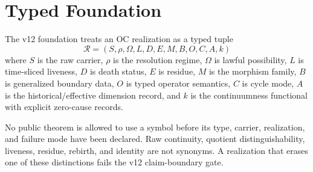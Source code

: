 \section{Typed Foundation}

The v12 foundation treats an OC realization as a typed tuple
\[
  \mathcal{R}=(S,\rho,\Omega,L,D,E,M,B,O,C,A,k)
\]
where \(S\) is the raw carrier, \(\rho\) is the resolution regime, \(\Omega\) is lawful
possibility, \(L\) is time-sliced liveness, \(D\) is death status, \(E\) is residue,
\(M\) is the morphism family, \(B\) is generalized boundary data, \(O\) is typed operator
semantics, \(C\) is cycle mode, \(A\) is the historical/effective dimension record, and \(k\)
is the continuumness functional with explicit zero-cause records.

No public theorem is allowed to use a symbol before its type, carrier, realization, and failure
mode have been declared. Raw continuity, quotient distinguishability, liveness, residue, rebirth,
and identity are not synonyms. A realization that erases one of these distinctions fails the v12
claim-boundary gate.
